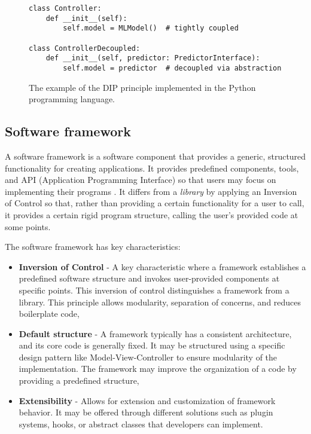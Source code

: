 \documentclass[
    bindingoffset=5mm,  %
    footnoteindent=3mm, %
    hyphenation=true    %
]{src/wut-thesis}
\begin{document}
\begin{figure}%
\begin{verbatim}
class Controller:
    def __init__(self):
        self.model = MLModel()  # tightly coupled

class ControllerDecoupled:
    def __init__(self, predictor: PredictorInterface):
        self.model = predictor  # decoupled via abstraction
\end{verbatim}
\caption{The example of the DIP principle implemented in the Python programming language.}
\label{fig:DepInversionPrinciple}
\end{figure}

\subsection{Software framework} \label{ch2:SoftwareFramework}

A software framework is a software component that provides a generic, structured functionality
for creating applications. It provides predefined components, tools, and API (Application Programming Interface)
so that users may focus on implementing their programs \cite{buschmann1996pattern}.
It differs from a \emph{library} by applying an Inversion of Control so that, rather than
providing a certain functionality for a user to call, it provides a certain rigid program
structure, calling the user’s provided code at some points.

The software framework has key characteristics:
\begin{itemize}
    \item \textbf{Inversion of Control} - A key characteristic where a framework establishes a predefined
        software structure and invokes user-provided components at specific points. This inversion of
        control distinguishes a framework from a library. This principle allows modularity,
        separation of concerns, and reduces boilerplate code,
    \item \textbf{Default structure} - A framework typically has a consistent architecture, and its
        core code is generally fixed. It may be structured using a specific design pattern like
        Model-View-Controller to ensure modularity of the implementation. The framework may improve
        the organization of a code by providing a predefined structure,
    \item \textbf{Extensibility} - Allows for extension and customization of framework behavior.
        It may be offered through different solutions such as plugin systems, hooks, or abstract
        classes that developers can implement.
\end{itemize}
\end{document}
